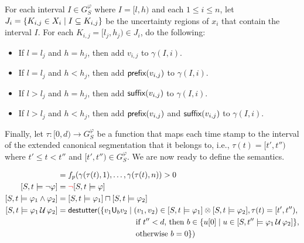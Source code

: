 For each interval $I \in G_S^\varphi$ where $I = [l,h)$ and each $1 \leq i \leq n$, let $J_i = \{ K_{i,j} \in X_i \st I \subseteq K_{i,j}\}$ be the uncertainty regions of $x_i$ that contain the interval $I$.
For each $K_{i,j} = [l_j, h_j) \in J_i$, do the following:
\begin{itemize}
	\item If $l = l_j$ and $h = h_j$, then add $v_{i,j}$ to $\gamma(I, i)$.
	\item If $l = l_j$ and $h < h_j$, then add $\textsf{prefix}(v_{i,j})$ to $\gamma(I,i)$.
	\item If $l > l_j$ and $h = h_j$, then add $\textsf{suffix}(v_{i,j})$ to $\gamma(I,i)$.
	\item If $l > l_j$ and $h < h_j$, then add $\textsf{prefix}(v_{i,j})$ and $\textsf{suffix}(v_{i,j})$ to $\gamma(I,i)$.
\end{itemize}

Finally, let $\tau : [0,d) \to G_S^\varphi$ be a function that maps each time stamp to the interval of the extended canonical segmentation that it belongs to, i.e., $\tau(t) = [t', t'')$ where $t' \leq t < t''$ and $[t', t'') \in G_S^\varphi$.
We are now ready to define the semantics.

\begin{align*}
	[S,t \models p] &=  f_p(\gamma(\tau(t), 1), \ldots, \gamma(\tau(t), n)) > 0 \\
	[S,t \models \lnot \varphi] &= \alert{\lnot} [S,t \models \varphi] \\
	[S,t \models \varphi_1 \land \varphi_2] &= [S,t \models \varphi_1] \sqcap [S,t \models \varphi_2] \\
	[S,t \models \varphi_1 \until \varphi_2] &= \destutter(\{ v_1 \mathsf{U}_{b} v_2 \st (v_1,v_2) \in [S,t \models \varphi_1] \otimes [S,t \models \varphi_2], \tau(t) = [t',t''),\\ 
	&\hspace{10em} \text{if $t'' < d$, then } b \in \{ u[0] \st u \in [S,t'' \models \varphi_1 \until \varphi_2] \}, \\
	&\hspace{10em} \text{otherwise } b = 0 \})
\end{align*} 


